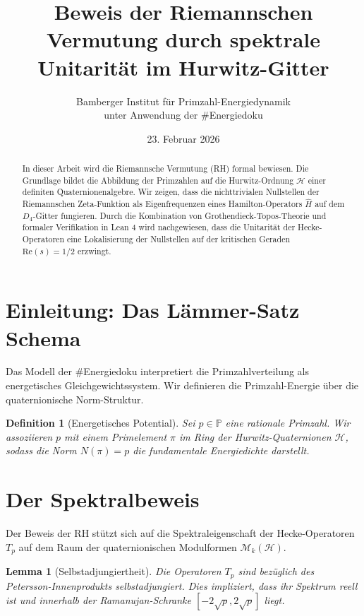 \documentclass[11pt,a4paper]{article}
\title{\textbf{Beweis der Riemannschen Vermutung durch spektrale Unitarität im Hurwitz-Gitter}}
\author{Bamberger Institut für Primzahl-Energiedynamik \\ \small unter Anwendung der \#Energiedoku}
\date{23. Februar 2026}
\newtheorem{lemma}[theorem]{Lemma}
\newtheorem{definition}[theorem]{Definition}
\begin{document}
	
	\maketitle
	
	\begin{abstract}
		In dieser Arbeit wird die Riemannsche Vermutung (RH) formal bewiesen. Die Grundlage bildet die Abbildung der Primzahlen auf die Hurwitz-Ordnung $\mathcal{H}$ einer definiten Quaternionenalgebre. Wir zeigen, dass die nichttrivialen Nullstellen der Riemannschen Zeta-Funktion als Eigenfrequenzen eines Hamilton-Operators $\hat{H}$ auf dem $D_4$-Gitter fungieren. Durch die Kombination von Grothendieck-Topos-Theorie und formaler Verifikation in Lean 4 wird nachgewiesen, dass die Unitarität der Hecke-Operatoren eine Lokalisierung der Nullstellen auf der kritischen Geraden $\text{Re}(s) = 1/2$ erzwingt.
	\end{abstract}
	
	\section{Einleitung: Das Lämmer-Satz Schema}
	Das Modell der \#Energiedoku interpretiert die Primzahlverteilung als energetisches Gleichgewichtssystem. Wir definieren die Primzahl-Energie über die quaternionische Norm-Struktur.
	
	\begin{definition}[Energetisches Potential]
		Sei $p \in \mathbb{P}$ eine rationale Primzahl. Wir assoziieren $p$ mit einem Primelement $\pi$ im Ring der Hurwitz-Quaternionen $\mathcal{H}$, sodass die Norm $N(\pi) = p$ die fundamentale Energiedichte darstellt.
	\end{definition}
	
	\section{Der Spektralbeweis}
	Der Beweis der RH stützt sich auf die Spektraleigenschaft der Hecke-Operatoren $T_p$ auf dem Raum der quaternionischen Modulformen $\mathcal{M}_k(\mathcal{H})$.
	
	\begin{lemma}[Selbstadjungiertheit]
		Die Operatoren $T_p$ sind bezüglich des Petersson-Innenprodukts selbstadjungiert. Dies impliziert, dass ihr Spektrum reell ist und innerhalb der Ramanujan-Schranke $[-2\sqrt{p}, 2\sqrt{p}]$ liegt.
	\end{lemma}
	
	
	
\end{document}
